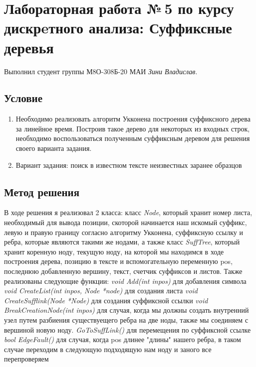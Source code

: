 \documentclass[12pt]{article}
\begin{document}
    \section*{Лабораторная работа №\,5 по курсу дискрeтного анализа: 
    Суффиксные деревья}

    Выполнил студент группы М8О-308Б-20 МАИ \textit{Зини Владислав}.

    \subsection*{Условие}
 
    \begin{enumerate}
    \item Необходимо реализовать алгоритм Укконена построения суффиксного
    дерева за линейное время. Построив такое дерево для некоторых из
    входных строк, необходимо воспользоваться полученным суффиксным
    деревом для решения своего варианта задания.
    \item Вариант задания: поиск в известном тексте неизвестных заранее образцов
    \end{enumerate}

    \subsection*{Метод решения}

    В ходе решения я реализовал 2 класса: класс \textit{Node}, который хранит номер листа, необходимый для вывода позиции, скоторой начинается наш искомый суффикс, левую и правую границу согласно алгоритму Укконена,
    суффиксную ссылку и ребра, которые являются такими же нодами, а также класс \textit{SuffTree}, который хранит коренную ноду, текущую ноду, на которой мы находимся в ходе построения дерева, позицию в тексте и вспомогательную переменную pos,
    последнюю добавленную вершину, текст, счетчик суффиксов и листов.
    Также реализованы следующие функции:
    \textit{void Add(int inpos)} для добавления символа
    \textit{ void CreateList(int inpos, Node *node)} для создания листа
    \textit{void CreateSufflink(Node *Node)} для создания суффиксной ссылки
    \textit{void BreakCreationNode(int inpos)} для случая, когда мы должны создать внутренний узел путем разбиения существуещего ребра на две ноды, также мы соединяем с вершиной новую ноду.
    \textit{GoToSuffLink()} для перемещения по суффиксной ссылке
    \textit{bool EdgeFault()} для случая, когда pos длинее "длины" нашего ребра, в таком случае переходим в следующую подходящую нам ноду и заного все перепроверяем
\end{document}
